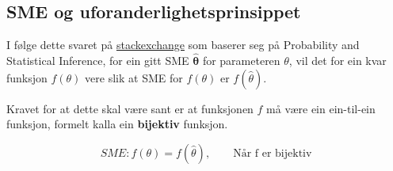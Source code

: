 \subsection{SME og uforanderlighetsprinsippet}
I følge dette svaret på \href{https://stats.stackexchange.com/questions/77573/invariance-property-of-mle-what-is-the-mle-of-theta2-of-normal-barx2}{stackexchange} som baserer seg på Probability and Statistical Inference\cite{mukhopadhyay2020probability}, for ein gitt SME $\boldsymbol{\hat{\theta}}$ for parameteren $\theta$, vil det for ein kvar funksjon $f(\theta)$ vere slik at SME for $f(\theta)$ er $f(\hat{\theta})$.

Kravet for at dette skal være sant er at funksjonen $f$ må være ein ein-til-ein funksjon, formelt kalla ein \textbf{bijektiv} funksjon.

\begin{equation}
    SME: f(\theta) = f(\hat{\theta}), \qquad \text{Når f er bijektiv}
\end{equation}